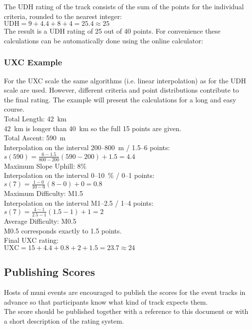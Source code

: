 \documentclass[a4paper,oneside]{scrartcl}
\begin{document}
The UDH rating of the track consists of the sum of the points for the individual criteria, 
rounded to the nearest integer:\\
$\mathrm{UDH} = 9 + 4.4 + 8 + 4 = 25.4 \approx 25$\\
The result is a UDH rating of 25 out of 40 points. For convenience these calculations 
can be automatically done using the online calculator: %

\subsubsection{UXC Example}
For the UXC scale the same algorithms (i.e. linear interpolation) as for the UDH scale are used. However, different criteria and point distributions contribute
to the final rating. The example will present the calculations for a long and easy course.\\

{\parindent0pt
Total Length: 42~km\\
42~km is longer than 40~km so the full 15 points are given. \\

Total Ascent: 590~m\\
Interpolation on the interval 200--800~m / 1.5--6 points:\\
$s(590) = \frac{6 - 1.5}{800 - 200} (590 - 200) + 1.5 = 4.4$\\

Maximum Slope Uphill:  8\% \\
Interpolation on the interval 0--10~\% / 0--1 points:\\
$s(7) = \frac{1 - 0}{10 - 0} (8 - 0) + 0 = 0.8$\\

Maximum Difficulty: M1.5\\
Interpolation on the interval M1--2.5 / 1--4 points:\\
$s(7) = \frac{4 - 1}{2.5 - 1} (1.5 - 1) + 1 = 2$\\

Average Difficulty: M0.5\\
M0.5 corresponds exactly to 1.5 points.\\

Final UXC rating:\\
$\mathrm{UXC} = 15 + 4.4 + 0.8 + 2 + 1.5 = 23.7 \approx 24$\\
}

\subsection{Publishing Scores}
Hosts of muni events are encouraged to publish the scores for the event tracks
in advance so that participants know what kind of track expects them.\\ The
score should be published together with a reference to this document or with a
short description of the rating system.
\end{document}
